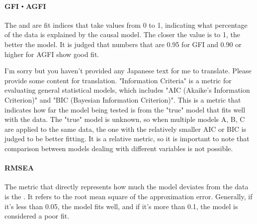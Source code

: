 \documentclass{ltjsbook}
\begin{document}
\paragraph{GFI・AGFI} The  and  are fit indices that take values from 0 to 1, indicating what percentage of the data is explained by the causal model. The closer the value is to 1, the better the model. It is judged that numbers that are 0.95 for GFI and 0.90 or higher for AGFI show good fit.

I'm sorry but you haven't provided any Japanese text for me to translate. Please provide some content for translation.
"Information Criteria" is a metric for evaluating general statistical models, which includes "AIC (Akaike's Information Criterion)" and "BIC (Bayesian Information Criterion)". This is a metric that indicates how far the model being tested is from the "true" model that fits well with the data. The "true" model is unknown, so when multiple models A, B, C are applied to the same data, the one with the relatively smaller AIC or BIC is judged to be better fitting. It is a relative metric, so it is important to note that comparison between models dealing with different variables is not possible.
\paragraph{RMSEA}
The metric that directly represents how much the model deviates from the data is the . It refers to the root mean square of the approximation error. Generally, if it's less than 0.05, the model fits well, and if it's more than 0.1, the model is considered a poor fit.
\end{document}
